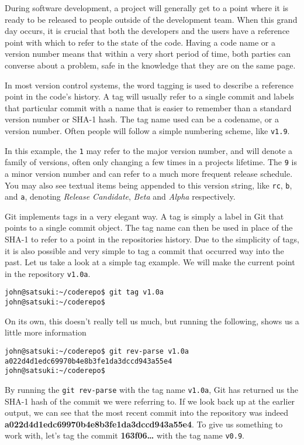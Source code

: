 During software development, a project will generally get to a point where it is ready to be released to people outside of the development team.  When this grand day occurs, it is crucial that both the developers and the users have a reference point with which to refer to the state of the code.  Having a code name or a version number means that within a very short period of time, both parties can converse about a problem, safe in the knowledge that they are on the same page.

In most version control systems, the word tagging is used to describe a reference point in the code's history.  A tag will usually refer to a single commit and labels that particular commit with a name that is easier to remember than a standard version number or SHA-1 hash.  The tag name used can be a codename, or a version number.  Often people will follow a simple numbering scheme, like \texttt{v1.9}.  

In this example, the \texttt{1} may refer to the major version number, and will denote a family of versions, often only changing a few times in a projects lifetime.  The \texttt{9} is a minor version number and can refer to a much more frequent release schedule.  You may also see textual items being appended to this version string, like \texttt{rc}, \texttt{b}, and \texttt{a}, denoting \emph{Release Candidate}, \emph{Beta} and \emph{Alpha} respectively.

Git implements tags in a very elegant way.  A tag is simply a label in Git that points to a single commit object.  The tag name can then be used in place of the SHA-1 to refer to a point in the repositories history.  Due to the simplicity of tags, it is also possible and very simple to tag a commit that occurred way into the past.  Let us take a look at a simple tag example.  We will make the current point in the repository \texttt{v1.0a}.

\begin{Verbatim}
john@satsuki:~/coderepo$ git tag v1.0a
john@satsuki:~/coderepo$ 
\end{Verbatim}

On its own, this doesn't really tell us much, but running the following, shows us a little more information

\begin{Verbatim}
john@satsuki:~/coderepo$ git rev-parse v1.0a
a022d4d1edc69970b4e8b3fe1da3dccd943a55e4
john@satsuki:~/coderepo$ 
\end{Verbatim}

By running the \texttt{git rev-parse} with the tag name \texttt{v1.0a}, Git has returned us the SHA-1 hash of the commit we were referring to.  If we look back up at the earlier output, we can see that the most recent commit into the repository was indeed \textbf{a022d4d1edc69970b4e8b3fe1da3dccd943a55e4}.  To give us something to work with, let's tag the commit \textbf{163f06\ldots} with the tag name \texttt{v0.9}.

